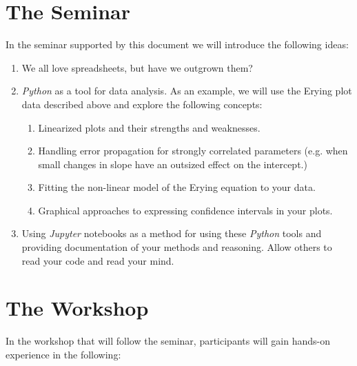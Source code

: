 \documentclass{tufte-handout}
\begin{document}
\section{The Seminar}

In the seminar supported by this document we will introduce the following ideas:

\begin{enumerate}

\item We all love spreadsheets, but have we outgrown them?

\item \textit{Python} as a tool for data analysis. As an example, we will use the Erying plot data described above and explore the following concepts:

\begin{enumerate}

\item Linearized plots and their strengths and weaknesses.
\item Handling error propagation for strongly correlated parameters (e.g. when small changes in slope have an outsized effect on the intercept.)
\item Fitting the non-linear model of the Erying equation to your data.
\item Graphical approaches to expressing confidence intervals in your plots.

\end{enumerate}

\item Using \textit{Jupyter} notebooks as a method for using these \textit{Python} tools and providing documentation of your methods and reasoning. Allow others to read your code and read your mind.

\end{enumerate}


\section{The Workshop}

In the workshop that will follow the seminar, participants will gain hands-on experience in the following:
\end{document}
